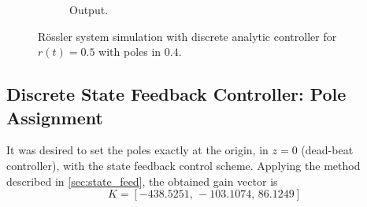 \begin{figure}
\begin{subfigure}[b]{0.475\textwidth}
            \caption{Output.}
        \end{subfigure}
        \caption{Rössler system simulation with discrete analytic controller for $r(t)=0.5$ with poles in $0.4$.}
        \label{fig:anal_u_0_5_poles_0_4}
	\end{figure}
	
	
	\subsection{Discrete State Feedback Controller: Pole Assignment}
	It was desired to set the poles exactly at the origin, in $z=0$ (dead-beat controller), with the state feedback control scheme. Applying the method described in \ref{sec:state_feed}, the obtained gain vector is
    \begin{equation}
        K=[-438.5251,\,-103.1074,\,86.1249]
    \end{equation}
	
